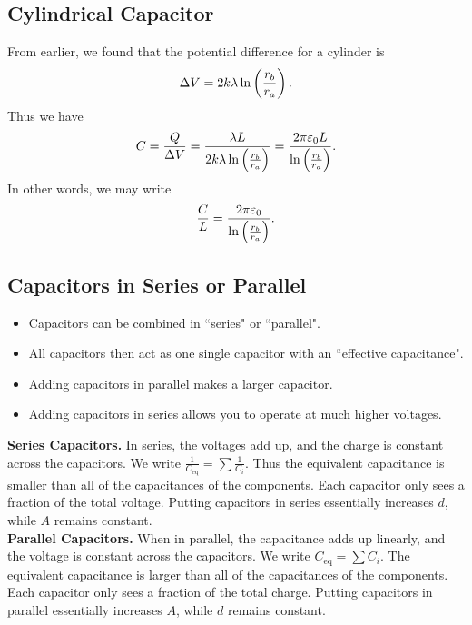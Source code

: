 \documentclass[class=article, crop=false]{standalone}
\begin{document}
  \subsection{Cylindrical Capacitor}
  From earlier, we found that the potential difference for a cylinder is
  \[
    \Delta V = 2k\lambda\ln \left( \frac{r_b}{r_a} \right).
  \]
  Thus we have
  \[
    C = \frac{Q}{\Delta V} = \frac{\lambda L}{2k\lambda\ln \left( \frac{r_b}{r_a} \right)} = \frac{2\pi \varepsilon_0 L}{\ln \left( \frac{r_b}{r_a} \right)}.
  \]
  In other words, we may write
  \[
    \frac{C}{L} = \frac{2\pi\varepsilon_0}{\ln \left( \frac{r_b}{r_a} \right)}.
  \]
  \subsection{Capacitors in Series or Parallel}
  \begin{itemize}
    \item Capacitors can be combined in ``series" or ``parallel".
    \item All capacitors then act as one single capacitor with an ``effective capacitance".
    \item Adding capacitors in parallel makes a larger capacitor.
    \item Adding capacitors in series allows you to operate at much higher voltages.
  \end{itemize}
  \textbf{Series Capacitors.} In series, the voltages add up, and the charge is constant across the capacitors. We write $\frac{1}{C_{\text{eq}}} = \sum \frac{1}{C_i}$. Thus the equivalent capacitance is smaller than all of the capacitances of the components. Each capacitor only sees a fraction of the total voltage. Putting capacitors in series essentially increases $d$, while $A$ remains constant. \\[10pt]
  \textbf{Parallel Capacitors.} When in parallel, the capacitance adds up linearly, and the voltage is constant across the capacitors. We write $C_{\text{eq}} = \sum C_i$. The equivalent capacitance is larger than all of the capacitances of the components. Each capacitor only sees a fraction of the total charge. Putting capacitors in parallel essentially increases $A$, while $d$ remains constant.
\end{document}
